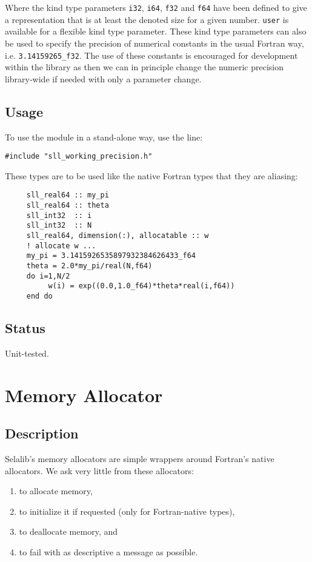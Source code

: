\documentclass[]{report}   %
\begin{document}
Where the kind type parameters \verb+i32+, \verb+i64+, \verb+f32+ and \verb+f64+ have been defined to give a representation that is at least the denoted size for a given number. \verb+user+ is available for a flexible kind type parameter. These kind type parameters can also be used to specify the precision of numerical constants in the usual Fortran way, i.e. \verb+3.14159265_f32+. The use of these constants is encouraged for development within the library as then we can in principle change the numeric precision library-wide if needed with only a parameter change.

\subsection{Usage}
To use the module in a stand-alone way, use the line:
\begin{verbatim}
#include "sll_working_precision.h"
\end{verbatim}

These types are to be used like the native Fortran types that they are aliasing:

\begin{verbatim}
     sll_real64 :: my_pi
     sll_real64 :: theta
     sll_int32  :: i
     sll_int32  :: N
     sll_real64, dimension(:), allocatable :: w
     ! allocate w ...
     my_pi = 3.1415926535897932384626433_f64
     theta = 2.0*my_pi/real(N,f64)
     do i=1,N/2
          w(i) = exp((0.0,1.0_f64)*theta*real(i,f64))
     end do
\end{verbatim}

\subsection{Status}
Unit-tested.

\section{Memory Allocator}
\subsection{Description}
Selalib's memory allocators are simple wrappers around Fortran's native allocators. We ask very little from these allocators:
\begin{enumerate}
\item to allocate memory, 
\item to initialize it if requested (only for Fortran-native types), 
\item to deallocate memory, and 
\item to fail with as descriptive a message as possible.
\end{enumerate}
\end{document}
